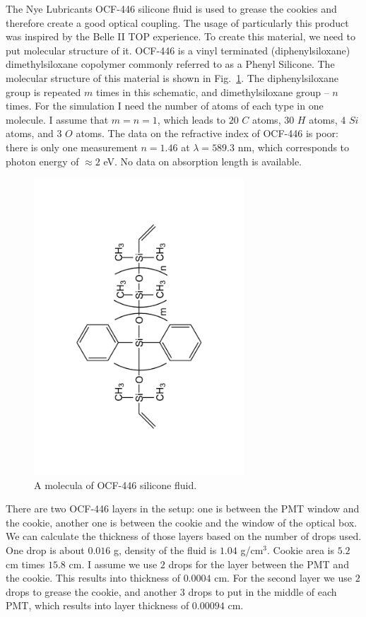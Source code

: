 \documentclass[11pt, a4paper]{article}
\begin{document}
The Nye Lubricants OCF-446 silicone fluid is used to grease the cookies and therefore create a good optical coupling. The usage of particularly this product was inspired by the Belle II TOP experience. To create this material, we need to put molecular structure of it. OCF-446 is a vinyl terminated (diphenylsiloxane) dimethylsiloxane copolymer commonly referred to as a Phenyl Silicone. The molecular structure of this material is shown in Fig.~\ref{pic:ocf}. The diphenylsiloxane group is repeated $m$ times in this schematic, and dimethylsiloxane group -- $n$ times. For the simulation I need the number of atoms of each type in one molecule. I assume that $m = n = 1$, which leads to $20$ $C$ atoms, $30$ $H$ atoms, $4$ $Si$ atoms, and $3$ $O$ atoms. The data on the refractive index of OCF-446 is poor: there is only one measurement $n = 1.46$ at $\lambda = 589.3$ nm, which corresponds to photon energy of $\approx 2$  eV. No data on absorption length is available.

\begin{figure}[htb]
\centering
\includegraphics[angle=270,width=0.7\textwidth]{pics/ocf.pdf}
\caption{\label{pic:ocf}
A molecula of OCF-446 silicone fluid.
}
\end{figure}

There are two OCF-446 layers in the setup: one is between the PMT window and the cookie, another one is between the cookie and the window of the optical box. We can calculate the thickness of those layers based on the number of drops used. One drop is about $0.016$ g, density of the fluid is $1.04$ g/cm$^{3}$. Cookie area is $5.2$ cm times $15.8$ cm. I assume we use $2$ drops for the layer between the PMT and the cookie. This results into thickness of $0.0004$ cm. For the second layer we use $2$ drops to grease the cookie, and another $3$ drops to put in the middle of each PMT, which results into layer thickness of $0.00094$ cm.
\end{document}
